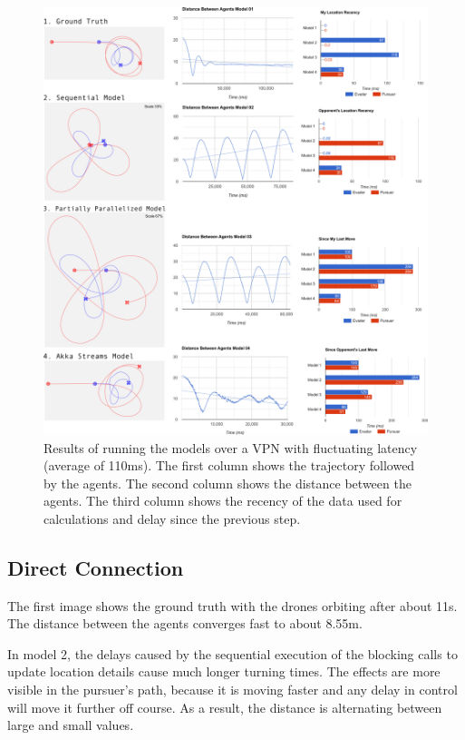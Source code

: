 \documentclass{article}
\begin{document}
\begin{figure}
	\centering
	\includegraphics[width=17.0cm]{charts-vpn}
	\caption{Results of running the models over a VPN with fluctuating latency (average of 110ms). The first column shows the trajectory followed by the agents. The second column shows the distance between the agents. The third column shows the recency of the data used for calculations and delay since the previous step.}\label{fig:charts-vpn}
\end{figure}

\afterpage{\clearpage}

\subsection{Direct Connection}
The first image shows the ground truth with the drones orbiting after about 11s. The distance between the agents converges fast to about 8.55m.

In model 2, the delays caused by the sequential execution of the blocking calls to update location details cause much longer turning times. The effects are more visible in the pursuer's path, because it is moving faster and any delay in control will move it further off course. As a result, the distance is alternating between large and small values.
\end{document}
